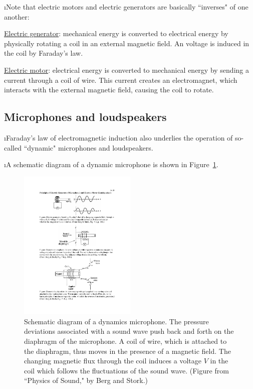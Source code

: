 \i Note that electric motors and electric generators are basically 
``inverses" of one another:

\underline{Electric generator}: 
mechanical energy is converted to electrical energy
by physically rotating a coil in an external magnetic field. 
An voltage is induced in the coil by Faraday's law.

\underline{Electric motor}: 
electrical energy is converted to mechanical energy 
by sending a current through a coil of wire.  
This current creates an electromagnet, which interacts with the 
external magnetic field, causing the coil to rotate.

\ei

\subsection{Microphones and loudspeakers}

\bi

\i Faraday's law of electromagnetic induction also underlies the
operation of so-called ``dynamic" microphones and loudspeakers.

\i A schematic diagram of a dynamic microphone is shown in 
Figure~\ref{f:microphone}.
%
\begin{figure}[htbp]
\begin{center}
\includegraphics[width=0.5\textwidth]{microphone}
\caption{Schematic diagram of a dynamics microphone.
The pressure deviations associated with a sound wave
push back and forth on the diaphragm of the microphone.
A coil of wire, which is attached to the diaphragm, 
thus moves in the presence of a magnetic field.
The changing magnetic flux through the coil induces a voltage 
$V$ in the coil which follows the fluctuations of the sound wave.
(Figure from ``Physics of Sound," by Berg and Stork.)} 
\label{f:microphone}
\end{center}
\end{figure}
%

